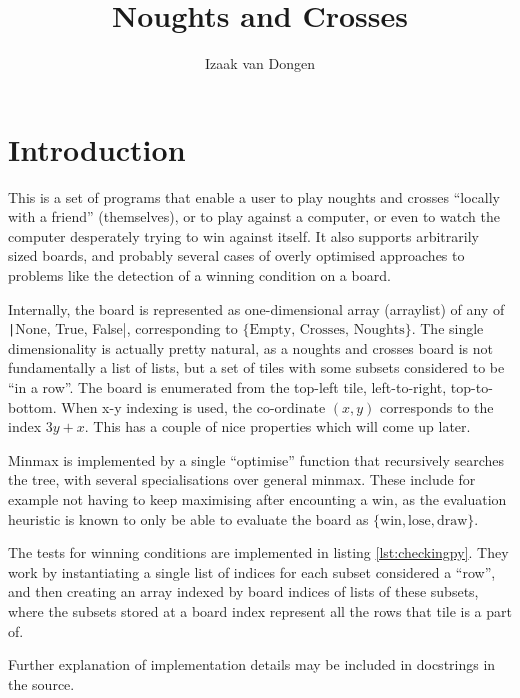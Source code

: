 \documentclass[fleqn,a4paper,11pt]{article}
\title{Noughts and Crosses}
\author{Izaak van Dongen}
\begin{document}
    \maketitle\thispagestyle{empty} %
    \tableofcontents
    \listoflistings

    \section{Introduction}

    This is a set of programs that enable a user to play noughts and crosses
    ``locally with a friend'' (themselves), or to play against a computer, or
    even to watch the computer desperately trying to win against itself. It also
    supports arbitrarily sized boards, and probably several cases of overly
    optimised approaches to problems like the detection of a winning condition
    on a board.

    Internally, the board is represented as one-dimensional array (arraylist) of
    any of \texttt|{None, True, False}|, corresponding to
    \(\{\text{Empty, Crosses, Noughts}\}\). The single dimensionality is actually
    pretty natural, as a noughts and crosses board is not fundamentally a list
    of lists, but a set of tiles with some subsets considered to be ``in a
    row''. The board is enumerated from the top-left tile, left-to-right,
    top-to-bottom. When x-y indexing is used, the co-ordinate \((x,y)\)
    corresponds to the index \(3y+x\). This has a couple of nice properties which
    will come up later.

    Minmax is implemented by a single ``optimise'' function that recursively
    searches the tree, with several specialisations over general minmax. These
    include for example not having to keep maximising after encounting a win, as
    the evaluation heuristic is known to only be able to evaluate the board as
    \(\{\text{win}, \text{lose}, \text{draw}\}\).

    The tests for winning conditions are implemented in listing
    \ref{lst:checkingpy}. They work by instantiating a single list of indices
    for each subset considered a ``row'', and then creating an array indexed by
    board indices of lists of these subsets, where the subsets stored at a board
    index represent all the rows that tile is a part of.

    Further explanation of implementation details may be included in docstrings
    in the source.
\end{document}
